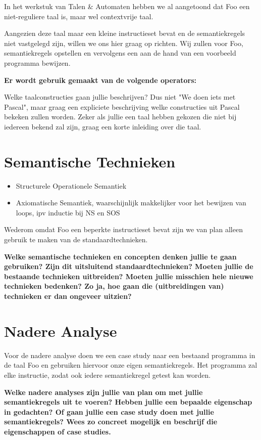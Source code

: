 \documentclass[11pt]{article}
\begin{document}
In het werkstuk van Talen \& Automaten hebben we al aangetoond dat Foo een niet-reguliere taal is, maar wel contextvrije taal.

Aangezien deze taal maar een kleine instructieset bevat en de semantiekregels niet vastgelegd zijn, willen we ons hier graag op richten. Wij zullen voor Foo, semantiekregels opstellen en vervolgens een aan de hand van een voorbeeld programma bewijzen.


{\bf
Er wordt gebruik gemaakt van de volgende operators: 

Welke taalconstructies gaan jullie beschrijven? Dus niet "We doen iets met Pascal", maar graag een expliciete beschrijving welke constructies uit Pascal bekeken zullen worden. Zeker als jullie een taal hebben gekozen die niet bij iedereen bekend zal zijn, graag een korte inleiding over die taal.
}



\section{Semantische Technieken}

\begin{itemize}
\item Structurele Operationele Semantiek
\item Axiomatische Semantiek, waarschijnlijk makkelijker voor het bewijzen van loops, ipv inductie bij NS en SOS
\end{itemize}

Wederom omdat Foo een beperkte instructieset bevat zijn we van plan alleen gebruik te maken van de standaardtechnieken.

{\bf
Welke semantische technieken en concepten denken jullie te gaan gebruiken? Zijn dit uitsluitend standaardtechnieken? Moeten jullie de bestaande technieken uitbreiden? Moeten jullie misschien hele nieuwe technieken bedenken? Zo ja, hoe gaan die (uitbreidingen van) technieken er dan ongeveer uitzien?
}
\section{Nadere Analyse}

Voor de nadere analyse doen we een case study naar een bestaand programma in de taal Foo en gebruiken hiervoor onze eigen semantiekregels. Het programma zal elke instructie, zodat ook iedere semantiekregel getest kan worden. 


{\bf
Welke nadere analyses zijn jullie van plan om met jullie semantiekregels uit te voeren? Hebben jullie een bepaalde eigenschap in gedachten? Of gaan jullie een case study doen met jullie semantiekregels? Wees zo concreet mogelijk en beschrijf die eigenschappen of case studies.
}
\end{document}
